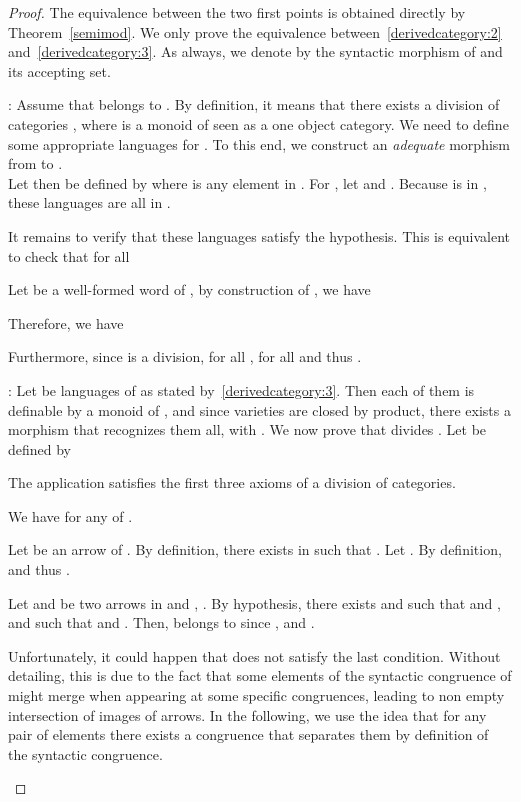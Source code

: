 \documentclass[submission,hidelink]{dmtcs-episciences}
\newenvironment{conditions}
{\begin{list}{\rm (\theenumi)}{\noindent \usecounter{enumi}\setlength{\topsep}{2pt}\setlength{\partopsep}{0pt}\setlength{\itemsep}{2pt}\setlength{\parsep}{0pt}\setlength{\leftmargin}{2.5em}\setlength{\labelwidth}{1.5em}\setlength{\labelsep}{0.5em}\setlength{\listparindent}{0pt}\setlength{\itemindent}{0pt}}}{\end{list}}
\begin{document}
		\begin{proof}
			The equivalence between the two first points is obtained directly by Theorem~\ref{semimod}. We only
			prove the equivalence between~\eqref{derivedcategory:2} and~\eqref{derivedcategory:3}.
			As always, we denote by  the syntactic morphism of  and  its
			accepting set.
\begin{conditions}
				\item[:]
				Assume that  belongs to . By definition, it means that there exists a division of categories
				, where  is a monoid of  seen as a one object category.
				We need to define some appropriate languages  for .
				To this end,
				we construct an \emph{adequate} morphism from  to . \\
Let then  be defined by 
				where  is any element in .
			  For , let  and
				. Because
				 is in , these languages are all in .

				It remains to verify that these languages satisfy the hypothesis. This is equivalent to check that
				for all 
				
				Let  be a well-formed word of , by construction of ,
				we have
				
				Therefore, we have
				
				Furthermore, since  is a division, for all ,
				 for all  and thus .

				\item[:]
					Let  be languages of  as stated by~\eqref{derivedcategory:3}.
					Then each of them is definable by a monoid of , and since varieties are closed by product, there exists a morphism  that recognizes them all, with .
					We now prove that  divides .
					Let   be defined by
					
					The application  satisfies the first three axioms of a division of categories.
					\begin{conditions}
						\item We have  for any  of .
						\item Let  be an arrow of .
						By definition, there exists  in  such that .
						Let . By definition,  and thus
						.
						\item Let  and  be two arrows in  and
						, . By hypothesis, there exists  and
						 such that
						 and , and such that  and
						. Then,  belongs to  since
						,  and .
					\end{conditions}
					Unfortunately, it could happen that  does not satisfy the last condition.
					Without detailing, this is due to the fact that
					some elements of the syntactic congruence of  might merge when appearing at some specific congruences, leading to non empty intersection of images of arrows.
					In the following, we use the idea that for any pair of elements there exists a congruence that separates them by definition of the syntactic congruence.


\end{conditions}
\end{proof}
\end{document}
